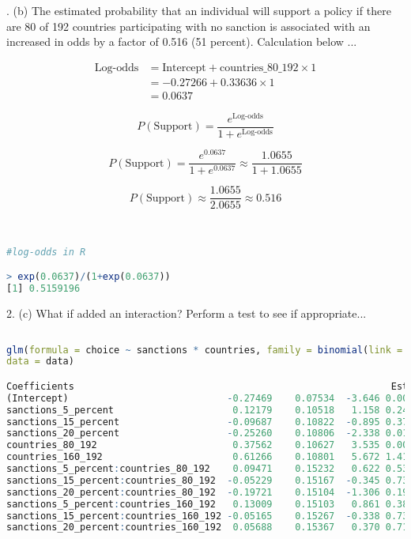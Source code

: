 \documentclass[12pt,letterpaper]{article}
\begin{document}
\vspace{1.0cm}

. (b) The estimated probability that an individual will support a policy if there are 80 of 192 countries participating with no sanction is associated with an increased in odds by a factor of 0.516 (51 percent). Calculation below ...


\begin{align*}
	\text{Log-odds} &= \text{Intercept} + \text{countries\_80\_192} \times 1 \\
	&= -0.27266 + 0.33636 \times 1 \\
	&= 0.0637
\end{align*}

\[
P(\text{Support}) = \frac{e^{\text{Log-odds}}}{1 + e^{\text{Log-odds}}}
\]

\[
P(\text{Support}) = \frac{e^{0.0637}}{1 + e^{0.0637}} \approx \frac{1.0655}{1 + 1.0655}
\]

\[
P(\text{Support}) \approx \frac{1.0655}{2.0655} \approx 0.516
\]

\

\begin{lstlisting}[language=R]
#log-odds in R

> exp(0.0637)/(1+exp(0.0637))
[1] 0.5159196

\end{lstlisting}

\newpage

2. (c) What if added an interaction? Perform a test to see if appropriate... \\

\begin{lstlisting}[language=R]
	
glm(formula = choice ~ sanctions * countries, family = binomial(link = "logit"), 
data = data)

Coefficients 														Estimate Std. Error z value Pr(>|z|)    
(Intercept)                            -0.27469    0.07534  -3.646 0.000267***
sanctions_5_percent                     0.12179    0.10518   1.158 0.246909    
sanctions_15_percent                   -0.09687    0.10822  -0.895 0.370723    
sanctions_20_percent                   -0.25260    0.10806  -2.338 0.019412 *  
countries_80_192                        0.37562    0.10627   3.535 0.000408***
countries_160_192                       0.61266    0.10801   5.672 1.41e-08***
sanctions_5_percent:countries_80_192    0.09471    0.15232   0.622 0.534071    
sanctions_15_percent:countries_80_192  -0.05229    0.15167  -0.345 0.730262    
sanctions_20_percent:countries_80_192  -0.19721    0.15104  -1.306 0.191675    
sanctions_5_percent:countries_160_192   0.13009    0.15103   0.861 0.389063    
sanctions_15_percent:countries_160_192 -0.05165    0.15267  -0.338 0.735136    
sanctions_20_percent:countries_160_192  0.05688    0.15367   0.370 0.711279 

\end{lstlisting}
\end{document}
